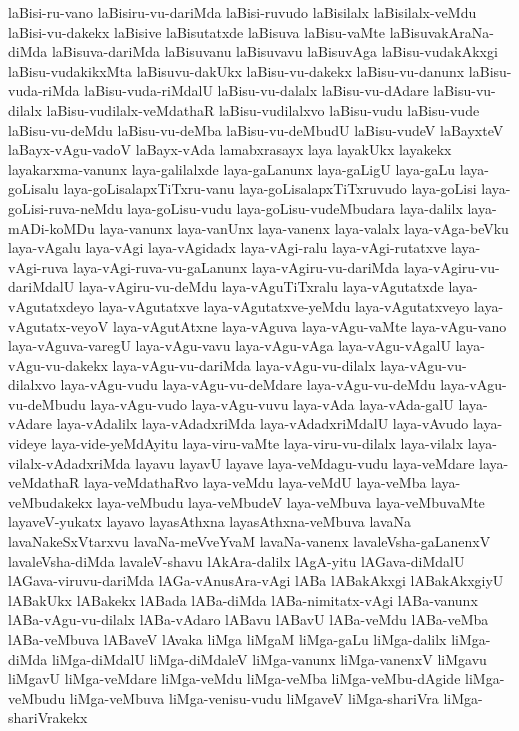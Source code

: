 {laBisi-ru-vano
laBisiru-vu-dariMda
laBisi-ruvudo
laBisilalx
laBisilalx-veMdu
laBisi-vu-dakekx
laBisive
laBisutatxde
laBisuva
laBisu-vaMte
laBisuvakAraNa-diMda
laBisuva-dariMda
laBisuvanu
laBisuvavu
laBisuvAga
laBisu-vudakAkxgi
laBisu-vudakikxMta
laBisuvu-dakUkx
laBisu-vu-dakekx
laBisu-vu-danunx
laBisu-vuda-riMda
laBisu-vuda-riMdalU
laBisu-vu-dalalx
laBisu-vu-dAdare
laBisu-vu-dilalx
laBisu-vudilalx-veMdathaR
laBisu-vudilalxvo
laBisu-vudu
laBisu-vude
laBisu-vu-deMdu
laBisu-vu-deMba
laBisu-vu-deMbudU
laBisu-vudeV
laBayxteV
laBayx-vAgu-vadoV
laBayx-vAda
lamabxrasayx
laya
layakUkx
layakekx
layakarxma-vanunx
laya-galilalxde
laya-gaLanunx
laya-gaLigU
laya-gaLu
laya-goLisalu
laya-goLisalapxTiTxru-vanu
laya-goLisalapxTiTxruvudo
laya-goLisi
laya-goLisi-ruva-neMdu
laya-goLisu-vudu
laya-goLisu-vudeMbudara
laya-dalilx
laya-mADi-koMDu
laya-vanunx
laya-vanUnx
laya-vanenx
laya-valalx
laya-vAga-beVku
laya-vAgalu
laya-vAgi
laya-vAgidadx
laya-vAgi-ralu
laya-vAgi-rutatxve
laya-vAgi-ruva
laya-vAgi-ruva-vu-gaLanunx
laya-vAgiru-vu-dariMda
laya-vAgiru-vu-dariMdalU
laya-vAgiru-vu-deMdu
laya-vAguTiTxralu
laya-vAgutatxde
laya-vAgutatxdeyo
laya-vAgutatxve
laya-vAgutatxve-yeMdu
laya-vAgutatxveyo
laya-vAgutatx-veyoV
laya-vAgutAtxne
laya-vAguva
laya-vAgu-vaMte
laya-vAgu-vano
laya-vAguva-varegU
laya-vAgu-vavu
laya-vAgu-vAga
laya-vAgu-vAgalU
laya-vAgu-vu-dakekx
laya-vAgu-vu-dariMda
laya-vAgu-vu-dilalx
laya-vAgu-vu-dilalxvo
laya-vAgu-vudu
laya-vAgu-vu-deMdare
laya-vAgu-vu-deMdu
laya-vAgu-vu-deMbudu
laya-vAgu-vudo
laya-vAgu-vuvu
laya-vAda
laya-vAda-galU
laya-vAdare
laya-vAdalilx
laya-vAdadxriMda
laya-vAdadxriMdalU
laya-vAvudo
laya-videye
laya-vide-yeMdAyitu
laya-viru-vaMte
laya-viru-vu-dilalx
laya-vilalx
laya-vilalx-vAdadxriMda
layavu
layavU
layave
laya-veMdagu-vudu
laya-veMdare
laya-veMdathaR
laya-veMdathaRvo
laya-veMdu
laya-veMdU
laya-veMba
laya-veMbudakekx
laya-veMbudu
laya-veMbudeV
laya-veMbuva
laya-veMbuvaMte
layaveV-yukatx
layavo
layasAthxna
layasAthxna-veMbuva
lavaNa
lavaNakeSxVtarxvu
lavaNa-meVveYvaM
lavaNa-vanenx
lavaleVsha-gaLanenxV
lavaleVsha-diMda
lavaleV-shavu
lAkAra-dalilx
lAgA-yitu
lAGava-diMdalU
lAGava-viruvu-dariMda
lAGa-vAnusAra-vAgi
lABa
lABakAkxgi
lABakAkxgiyU
lABakUkx
lABakekx
lABada
lABa-diMda
lABa-nimitatx-vAgi
lABa-vanunx
lABa-vAgu-vu-dilalx
lABa-vAdaro
lABavu
lABavU
lABa-veMdu
lABa-veMba
lABa-veMbuva
lABaveV
lAvaka
liMga
liMgaM
liMga-gaLu
liMga-dalilx
liMga-diMda
liMga-diMdalU
liMga-diMdaleV
liMga-vanunx
liMga-vanenxV
liMgavu
liMgavU
liMga-veMdare
liMga-veMdu
liMga-veMba
liMga-veMbu-dAgide
liMga-veMbudu
liMga-veMbuva
liMga-venisu-vudu
liMgaveV
liMga-shariVra
liMga-shariVrakekx
}
